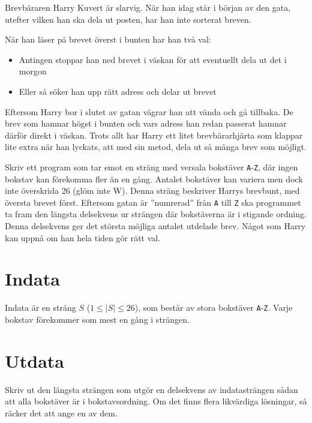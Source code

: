 
Brevbäraren Harry Kuvert är slarvig. När han idag står i början av den gata, utefter vilken han
ska dela ut posten, har han inte sorterat breven.

När han läser på brevet överst i bunten har han två val:
\begin{itemize}
    \item Antingen stoppar han ned brevet i väskan för att eventuellt dela ut det i morgon
    \item Eller så söker han upp rätt adress och delar ut brevet
\end{itemize}

Eftersom Harry bor i slutet av gatan vägrar han att vända och gå tillbaka. De brev som hamnar
högst i bunten och vars adress han redan passerat hamnar därför direkt i väskan.
Trots allt har Harry ett litet brevbärarhjärta som klappar lite extra när han lyckats, att med sin
metod, dela ut så många brev som möjligt.

Skriv ett program som tar emot en sträng med versala bokstäver \texttt{A}-\texttt{Z}, där ingen bokstav
kan förekomma fler än en gång. Antalet bokstäver kan variera men dock inte överskrida 26
(glöm inte W). Denna sträng beskriver Harrys brevbunt, med översta brevet först. Eftersom
gatan är ''numrerad'' från \texttt{A} till \texttt{Z} ska programmet ta fram den längsta delsekvens ur strängen
där bokstäverna är i stigande ordning. Denna delsekvens ger det största möjliga antalet
utdelade brev. Något som Harry kan uppnå om han hela tiden gör rätt val.

\section*{Indata}
Indata är en sträng $S$ ($1 \leq |S| \leq 26$), som består av stora bokstäver \texttt{A}-\texttt{Z}.
Varje bokstav förekommer som mest en gång i strängen.


\section*{Utdata}
Skriv ut den längsta strängen som utgör en delsekvens av indatasträngen sådan att alla bokstäver
är i bokstavsordning.
Om det finns flera likvärdiga lösningar, så räcker det att ange en av dem.
